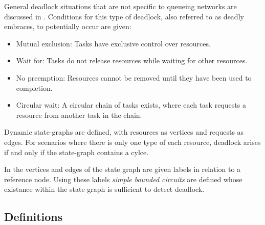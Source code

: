 \documentclass{article}
\begin{document}
General deadlock situations that are not specific to queueing networks are discussed in \cite{coffmanelphick71}.
Conditions for this type of deadlock, also referred to as deadly embraces, to potentially occur are given:
\begin{itemize}
  \item Mutual exclusion: Tasks have exclusive control over resources.
  \item Wait for: Tasks do not release resources while waiting for other resources.
  \item No preemption: Resources cannot be removed until they have been used to completion.
  \item Circular wait: A circular chain of tasks exists, where each task requests a resource from another task in the chain.
\end{itemize}
Dynamic state-graphs are defined, with resources as vertices and requests as edges.
For scenarios where there is only one type of each resource, deadlock arises if and only if the state-graph contains a cylce.

In \cite{choetal95} the vertices and edges of the state graph are given labels in relation to a reference node.
Using these labels \textit{simple bounded circuits} are defined whose existance within the state graph is sufficient to detect deadlock.


\subsection{Definitions}
\end{document}
